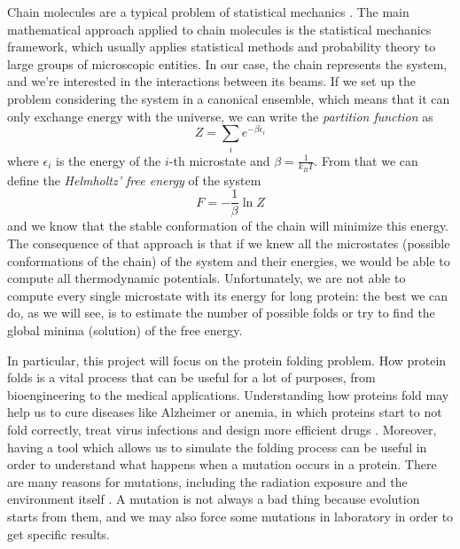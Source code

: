 Chain molecules are a typical problem of statistical mechanics \cite{statisticalmechanics}.
The main mathematical approach applied to chain molecules is the statistical mechanics framework, which usually applies statistical methods and probability theory to large groups of microscopic entities.
In our case, the chain represents the system, and we're interested in the interactions between its beams.
If we set up the problem considering the system in a canonical ensemble, which means that it can only exchange energy with the universe, we can write the \emph{partition function} as
\begin{equation*}
    Z = \sum_i e^{-\beta\epsilon_i}
\end{equation*}
where $\epsilon_i$ is the energy of the $i$-th microstate and $\beta = \frac{1}{k_BT}$.
From that we can define the \emph{Helmholtz' free energy} of the system
\begin{equation*}
    F = -\frac{1}{\beta} \ln Z
\end{equation*}
and we know that the stable conformation of the chain will minimize this energy.
The consequence of that approach is that if we knew all the microstates (possible conformations of the chain) of the system and their energies, we would be able to compute all thermodynamic potentials.
Unfortunately, we are not able to compute every single microstate with its energy for long protein: the best we can do, as we will see, is to estimate the number of possible folds or try to find the global minima (solution) of the free energy.

In particular, this project will focus on the protein folding problem.
How protein folds is a vital process that can be useful for a lot of purposes, from bioengineering to the medical applications.
Understanding how proteins fold may help us to cure diseases like Alzheimer or anemia, in which proteins start to not fold correctly, treat virus infections and design more efficient drugs \cite{PERM}. 
Moreover, having a tool which allows us to simulate the folding process can be useful in order to understand what happens when a mutation occurs in a protein.
There are many reasons for mutations, including the radiation exposure and the environment itself \cite{zanichelli}. A mutation is not always a bad thing because evolution starts from them, and we may also force some mutations in laboratory in order to get specific results.

